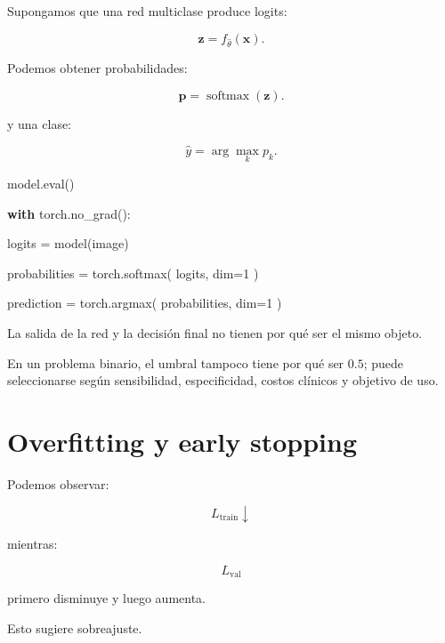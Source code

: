 \documentclass[
  letterpaper,
  DIV=11,
  numbers=noendperiod]{scrartcl}
\newenvironment{Shaded}{\begin{snugshade}}{\end{snugshade}}
\newcommand{\BuiltInTok}[1]{\textcolor[rgb]{0.00,0.23,0.31}{#1}}
\newcommand{\ControlFlowTok}[1]{\textcolor[rgb]{0.00,0.23,0.31}{\textbf{#1}}}
\newcommand{\DecValTok}[1]{\textcolor[rgb]{0.68,0.00,0.00}{#1}}
\newcommand{\NormalTok}[1]{\textcolor[rgb]{0.00,0.23,0.31}{#1}}
\newcommand{\OperatorTok}[1]{\textcolor[rgb]{0.37,0.37,0.37}{#1}}
\begin{document}
Supongamos que una red multiclase produce logits:

\[
\mathbf z=f_{\hat\theta}(\mathbf x).
\]

Podemos obtener probabilidades:

\[
\mathbf p
=
\operatorname{softmax}(\mathbf z).
\]

y una clase:

\[
\hat y
=
\arg\max_k p_k.
\]

\begin{Shaded}
\begin{Highlighting}[]
\NormalTok{model.}\BuiltInTok{eval}\NormalTok{()}

\ControlFlowTok{with}\NormalTok{ torch.no\_grad():}

\NormalTok{    logits }\OperatorTok{=}\NormalTok{ model(image)}

\NormalTok{    probabilities }\OperatorTok{=}\NormalTok{ torch.softmax(}
\NormalTok{        logits,}
\NormalTok{        dim}\OperatorTok{=}\DecValTok{1}
\NormalTok{    )}

\NormalTok{    prediction }\OperatorTok{=}\NormalTok{ torch.argmax(}
\NormalTok{        probabilities,}
\NormalTok{        dim}\OperatorTok{=}\DecValTok{1}
\NormalTok{    )}
\end{Highlighting}
\end{Shaded}

La salida de la red y la decisión final no tienen por qué ser el mismo
objeto.

En un problema binario, el umbral tampoco tiene por qué ser \(0.5\);
puede seleccionarse según sensibilidad, especificidad, costos clínicos y
objetivo de uso.

\section{Overfitting y early
stopping}\label{overfitting-y-early-stopping}

Podemos observar:

\[
L_{\mathrm{train}}\downarrow
\]

mientras:

\[
L_{\mathrm{val}}
\]

primero disminuye y luego aumenta.

Esto sugiere sobreajuste.
\end{document}
